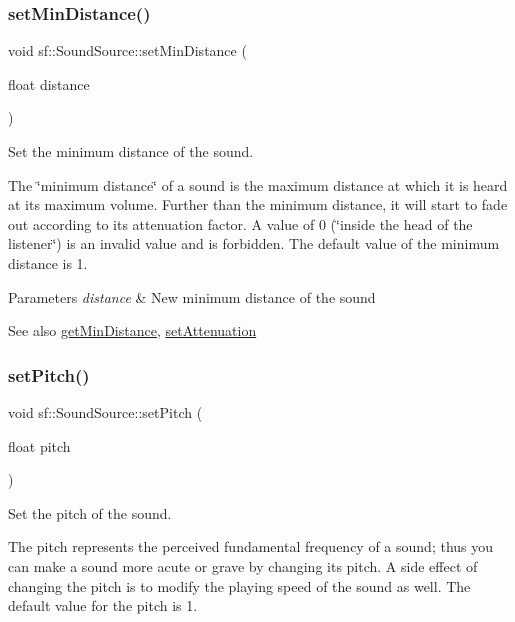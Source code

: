 \subsubsection{\texorpdfstring{set\+Min\+Distance()}{setMinDistance()}}
{\footnotesize\ttfamily void sf\+::\+Sound\+Source\+::set\+Min\+Distance (\begin{DoxyParamCaption}\item[{float}]{distance }\end{DoxyParamCaption})}



Set the minimum distance of the sound. 

The \char`\"{}minimum distance\char`\"{} of a sound is the maximum distance at which it is heard at its maximum volume. Further than the minimum distance, it will start to fade out according to its attenuation factor. A value of 0 (\char`\"{}inside the head
of the listener\char`\"{}) is an invalid value and is forbidden. The default value of the minimum distance is 1.


\begin{DoxyParams}{Parameters}
{\em distance} & New minimum distance of the sound\\
\hline
\end{DoxyParams}
\begin{DoxySeeAlso}{See also}
\hyperlink{classsf_1_1_sound_source_a605ca7f359ec1c36fcccdcd4696562ac}{get\+Min\+Distance}, \hyperlink{classsf_1_1_sound_source_aa2adff44cd2f8b4e3c7315d7c2a45626}{set\+Attenuation} 
\end{DoxySeeAlso}
\mbox{\label{classsf_1_1_sound_source_a72a13695ed48b7f7b55e7cd4431f4bb6}} 
\subsubsection{\texorpdfstring{set\+Pitch()}{setPitch()}}
{\footnotesize\ttfamily void sf\+::\+Sound\+Source\+::set\+Pitch (\begin{DoxyParamCaption}\item[{float}]{pitch }\end{DoxyParamCaption})}



Set the pitch of the sound. 

The pitch represents the perceived fundamental frequency of a sound; thus you can make a sound more acute or grave by changing its pitch. A side effect of changing the pitch is to modify the playing speed of the sound as well. The default value for the pitch is 1.


